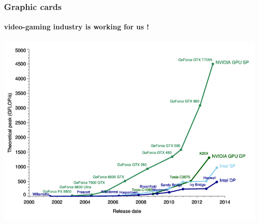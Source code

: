 \documentclass[10pt]{beamer}
\begin{document}
\begin{frame}

\end{frame}


\begin{frame}
  \frametitle{Graphic cards}
  \framesubtitle{video-gaming industry is working for us !}

  \begin{center}
    \includegraphics[width=.75\textwidth]{cpu-vs-gpu.png}
  \end{center}
\end{frame}
\end{document}
